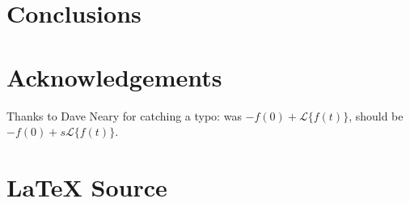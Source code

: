 \documentclass{article}
\theoremstyle{definition}
\begin{document}
\section{Conclusions}
%
%
%
\section{Acknowledgements}
Thanks to Dave Neary for catching a typo: was $-f(0) +
\mathcal{L}\{f(t)\}$, should be $-f(0) + s \mathcal{L}\{f(t)\}$. 

%
%
\section*{\LaTeX \hspace{0.10 mm} Source}
%
%
%


%
%
\end{document}
